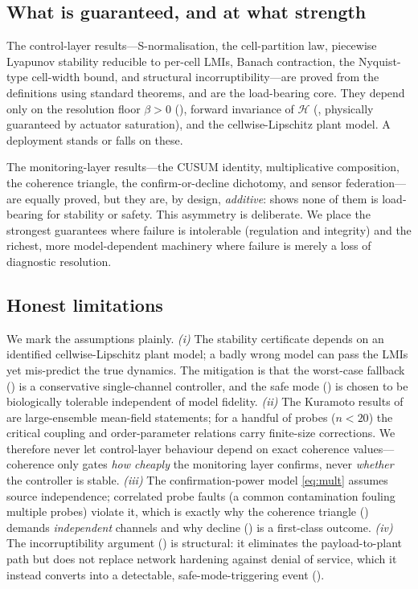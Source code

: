 \documentclass[11pt,a4paper,twocolumn]{article}
\theoremstyle{thmstyle}
\theoremstyle{definition}
\theoremstyle{remark}
\newcommand{\Hs}{\mathcal{H}}
\newcommand{\floor}{\beta}
\begin{document}
\subsection{What is guaranteed, and at what strength}

The control-layer results---S-normalisation, the cell-partition law,
piecewise Lyapunov stability reducible to per-cell LMIs, Banach
contraction, the Nyquist-type cell-width bound, and structural
incorruptibility---are proved from the definitions using standard
theorems, and are the load-bearing core. They depend only on the
resolution floor $\floor>0$ (), forward invariance of
$\Hs$ (, physically guaranteed by actuator saturation),
and the cellwise-Lipschitz plant model. A deployment stands or falls on
these.

The monitoring-layer results---the CUSUM identity, multiplicative
composition, the coherence triangle, the confirm-or-decline dichotomy, and
sensor federation---are equally proved, but they are, by design,
\emph{additive}:  shows none of them is load-bearing
for stability or safety. This asymmetry is deliberate. We place the
strongest guarantees where failure is intolerable (regulation and
integrity) and the richest, more model-dependent machinery where failure
is merely a loss of diagnostic resolution.

\subsection{Honest limitations}

We mark the assumptions plainly.
\emph{(i)} The stability certificate depends on an identified
cellwise-Lipschitz plant model; a badly wrong model can pass the LMIs yet
mis-predict the true dynamics. The mitigation is that the worst-case
fallback () is a conservative single-channel
controller, and the safe mode () is chosen to be
biologically tolerable independent of model fidelity.
\emph{(ii)} The Kuramoto results of  are large-ensemble
mean-field statements; for a handful of probes ($n<20$) the critical
coupling and order-parameter relations carry finite-size corrections. We
therefore never let control-layer behaviour depend on exact coherence
values---coherence only gates \emph{how cheaply} the monitoring layer
confirms, never \emph{whether} the controller is stable.
\emph{(iii)} The confirmation-power model \eqref{eq:mult} assumes source
independence; correlated probe faults (a common contamination fouling
multiple probes) violate it, which is exactly why the coherence triangle
() demands \emph{independent} channels and why decline
() is a first-class outcome.
\emph{(iv)} The incorruptibility argument () is
structural: it eliminates the payload-to-plant path but does not replace
network hardening against denial of service, which it instead converts
into a detectable, safe-mode-triggering event ().
\end{document}
